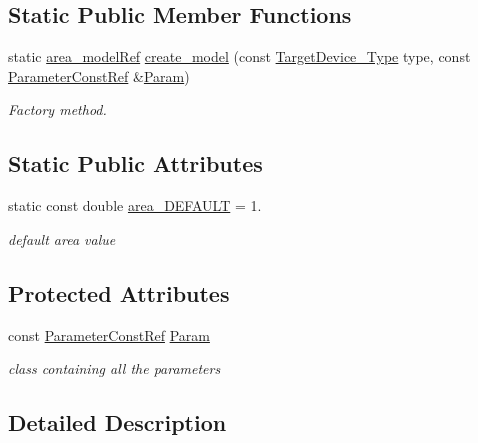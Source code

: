 \subsection*{Static Public Member Functions}
\begin{DoxyCompactItemize}
\item 
static \hyperlink{area__model_8hpp_aec11e4e9b1b3afd49a437cb37df0abfb}{area\+\_\+model\+Ref} \hyperlink{classarea__model_a3babf6a1d22f03e4ee955134f3d87d73}{create\+\_\+model} (const \hyperlink{target__device_8hpp_a476becc690220f0805ce73006449c732}{Target\+Device\+\_\+\+Type} type, const \hyperlink{Parameter_8hpp_a37841774a6fcb479b597fdf8955eb4ea}{Parameter\+Const\+Ref} \&\hyperlink{classarea__model_a33c8e77773f9fa818980e4b35e8d8851}{Param})
\begin{DoxyCompactList}\small\item\em Factory method. \end{DoxyCompactList}\end{DoxyCompactItemize}
\subsection*{Static Public Attributes}
\begin{DoxyCompactItemize}
\item 
static const double \hyperlink{classarea__model_a6a0342e6f7fd957572096e1c2a4d8406}{area\+\_\+\+D\+E\+F\+A\+U\+LT} = 1.
\begin{DoxyCompactList}\small\item\em default area value \end{DoxyCompactList}\end{DoxyCompactItemize}
\subsection*{Protected Attributes}
\begin{DoxyCompactItemize}
\item 
const \hyperlink{Parameter_8hpp_a37841774a6fcb479b597fdf8955eb4ea}{Parameter\+Const\+Ref} \hyperlink{classarea__model_a33c8e77773f9fa818980e4b35e8d8851}{Param}
\begin{DoxyCompactList}\small\item\em class containing all the parameters \end{DoxyCompactList}\end{DoxyCompactItemize}


\subsection{Detailed Description}



